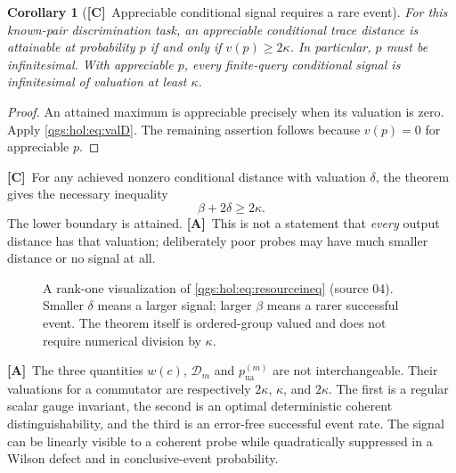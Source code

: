 \documentclass[11pt,oneside]{article}
\numberwithin{equation}{section}
\theoremstyle{plain}
\newtheorem{corollary}[corollary]{Corollary}
\theoremstyle{definition}
\theoremstyle{remark}
\newcommand{\TD}{\mathcal D}
\newcommand{\TC}{\textcolor{TierC}{\textsf{\bfseries[C]}}}
\newcommand{\TA}{\textcolor{TierA}{\textsf{\bfseries[A]}}}
\begin{document}
\begin{corollary}[\TC\ Appreciable conditional signal requires a rare event]\label{qgs:hol:cor:rare}
For this known-pair discrimination task, an appreciable conditional trace distance is attainable at probability $p$ if and only if $v(p)\geq2\kappa$. In particular, $p$ must be infinitesimal. With appreciable $p$, every finite-query conditional signal is infinitesimal of valuation at least $\kappa$.
\end{corollary}
\begin{proof}
An attained maximum is appreciable precisely when its valuation is zero. Apply \eqref{qgs:hol:eq:valD}. The remaining assertion follows because $v(p)=0$ for appreciable $p$.
\end{proof}

\TC\ For any achieved nonzero conditional distance with valuation $\delta$, the theorem gives the necessary inequality
\begin{equation}\label{qgs:hol:eq:resourceineq}
 \beta+2\delta\geq2\kappa.
\end{equation}
The lower boundary is attained. \TA\ This is not a statement that \emph{every} output distance has that valuation; deliberately poor probes may have much smaller distance or no signal at all.

\begin{figure}[ht]
\centering
{}
\caption{A rank-one visualization of \eqref{qgs:hol:eq:resourceineq} (source 04). Smaller $\delta$ means a larger signal; larger $\beta$ means a rarer successful event. The theorem itself is ordered-group valued and does not require numerical division by $\kappa$.}
\label{qgs:hol:fig:frontier}
\end{figure}

\TA\ The three quantities $w(c)$, $\TD_m$ and $p_{\mathrm{ua}}^{(m)}$ are not interchangeable. Their valuations for a commutator are respectively $2\kappa$, $\kappa$, and $2\kappa$. The first is a regular scalar gauge invariant, the second is an optimal deterministic coherent distinguishability, and the third is an error-free successful event rate. The signal can be linearly visible to a coherent probe while quadratically suppressed in a Wilson defect and in conclusive-event probability.
\end{document}
